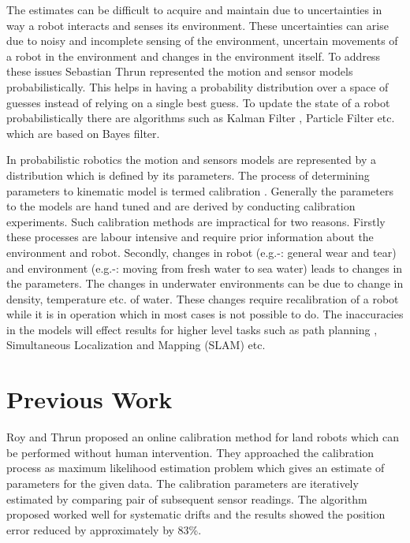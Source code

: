 \documentclass[12pt]{dalcsthesis}
\begin{document}
The estimates can be difficult to acquire and maintain due to uncertainties in way a robot interacts and senses its environment. These uncertainties can arise due to noisy and incomplete sensing of the environment, uncertain movements of a robot in the environment and changes in the environment itself.  To address these issues Sebastian Thrun \cite{thrun2005probabilistic} represented the motion and sensor models probabilistically. This helps in having a probability distribution over a space of guesses instead of relying on a single best guess. To update the state of a robot probabilistically there are algorithms such as Kalman Filter \cite{kalman1960new}, Particle Filter \cite{gordon1993novel} etc. which are based on Bayes filter. 

In probabilistic robotics the motion and sensors models are represented by a distribution which is defined by its parameters.  The process of determining parameters to kinematic model is termed calibration \cite{cox1990autonomous} \cite{vukobratovic1989introduction}. Generally the parameters to the models are hand tuned and are derived by conducting calibration experiments. Such calibration methods are impractical for two reasons. Firstly these processes are labour intensive and require prior information about the environment and robot. Secondly, changes in robot (e.g.-:  general wear and tear) and environment (e.g.-: moving from fresh water to sea water) leads to changes in the parameters. The changes in underwater environments can be due to change in density, temperature etc. of water. These changes require recalibration of a robot while it is in operation which in most cases is not possible to do. The inaccuracies in the models will effect results for higher level tasks such as path planning \cite{Lav06}, Simultaneous Localization and 
Mapping (SLAM) \cite{thrun2005probabilistic} \cite{grisettiyz2005improving} etc.

\section{Previous Work}

Roy and Thrun \cite{Roy} proposed an online calibration method for land robots which can be performed without human intervention.  They approached the calibration process as maximum likelihood estimation problem which gives an estimate of parameters for the given data. The calibration parameters are iteratively estimated by comparing pair of subsequent sensor readings. The algorithm proposed worked well for systematic drifts and the results showed the position error reduced by approximately by 83\%.
\end{document}
